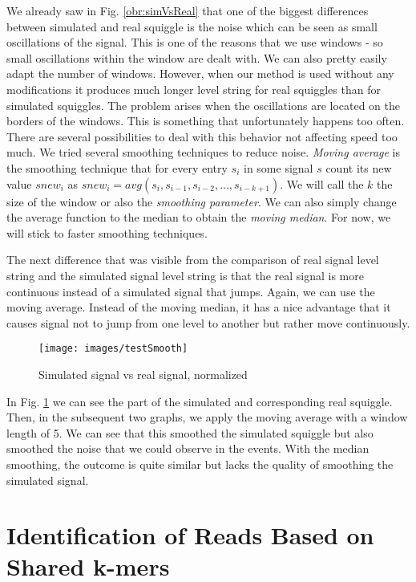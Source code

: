We already saw in Fig. \ref{obr:simVsReal} that one of the biggest differences between simulated and
real squiggle is the noise which can be seen as small oscillations of the signal. This is
one of the reasons that we use windows - so small oscillations within the window
are dealt with. We can also pretty easily adapt the number of windows.
However, when our method is used without any modifications it
produces much longer level string for real squiggles than for simulated squiggles.
The problem arises when the oscillations are located on the borders of the windows.
This is something that unfortunately happens too often. There are several
possibilities to deal with this behavior not affecting speed too
much. We tried several smoothing techniques to reduce noise. \textit{Moving average} is the
smoothing technique that for every entry $s_i$ in some signal $s$ count its new value
$snew_i$ as $snew_i = avg(s_{i}, s_{i-1}, s_{i-2}, \dots , s_{i-k+1})$. We will call the
$k$ the size of the window or also the \textit{smoothing parameter}. We can also simply change
the average function to the median to obtain the \textit{moving median}. For now, we will stick
to faster smoothing techniques.

The next difference that was visible from the comparison of real signal level string
and the simulated signal level string is that the real signal is more continuous instead
of a simulated signal that jumps. Again, we can use the moving average. Instead of
the moving median, it has a nice advantage that it causes signal not to jump from
one level to another but rather move continuously.

\begin{figure}
\centerline{\texttt{[image: images/testSmooth]}}
\caption[Hehe]{Simulated signal vs real signal, normalized}
\label{obr:testSmooth}
\end{figure}

In Fig. \ref{obr:testSmooth} we can see the part of the simulated and corresponding real squiggle.
Then, in the subsequent two graphs, we apply the moving average with a window length
of 5. We can see that this smoothed the simulated squiggle but also smoothed the noise
that we could observe in the events. With the median smoothing, the outcome is quite
similar but lacks the quality of smoothing the simulated signal.

\section{Identification of Reads Based on Shared k-mers}

